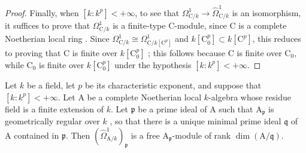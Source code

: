 \begin{proof}
Finally, when $[k:k^p]<+\infty$, to see that $\Omega^1_{\mathrm{C}/k}\to\hat{\Omega}^1_{\mathrm{C}/k}$ is an isomorphism, it suffices to prove that $\Omega^1_{\mathrm{C}/k}$ is a finite-type $\mathrm{C}$-module, since $\mathrm{C}$ is a complete Noetherian local ring . Since $\Omega^1_{\mathrm{C}/k}\cong\Omega^1_{\mathrm{C}/k[\mathrm{C}^p]}$ and $k[\mathrm{C}_0^p]\subset k[\mathrm{C}^p]$, this reduces to proving that $\mathrm{C}$ is finite over $k[\mathrm{C}_0^p]$ ; this follows because $\mathrm{C}$ is finite over $\mathrm{C}_0$, while $\mathrm{C}_0$ is finite over $k[\mathrm{C}_0^p]$ under the hypothesis $[k:k^p]<+\infty$.
\end{proof}

\begin{lemma}[18.11.3]
\label{IV.18.11.3}
Let $k$ be a field, let $p$ be its characteristic exponent, and suppose that $[k:k^p]<+\infty$. Let $\mathrm{A}$ be a complete Noetherian local $k$-algebra whose residue field is a finite extension of $k$. Let $\mathfrak{p}$ be a prime ideal of $\mathrm{A}$ such that $\mathrm{A}_{\mathfrak{p}}$ is geometrically regular over $k$ , so that there is a unique minimal prime ideal $\mathfrak{q}$ of $\mathrm{A}$ contained in $\mathfrak{p}$. Then $(\hat{\Omega}^1_{\mathrm{A}/k})_{\mathfrak{p}}$ is a free $\mathrm{A}_{\mathfrak{p}}$-module of rank $\dim(\mathrm{A}/\mathfrak{q})$.
\end{lemma}

